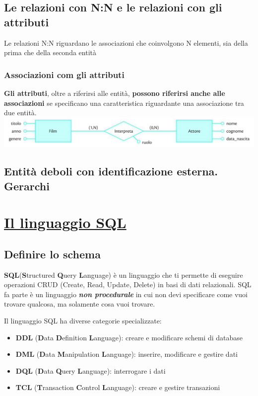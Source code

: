 \documentclass{article}
\begin{document}
\subsection{Le relazioni con N:N e le relazioni con gli attributi}
Le relazioni N:N riguardano le associazioni che coinvolgono N elementi, sia della prima che della seconda entità

\subsubsection{Associazioni com gli attributi}
\textbf{Gli attributi}, oltre a riferirsi alle entità, \textbf{possono riferirsi anche alle associazioni} se specificano una caratteristica riguardante una associazione tra due entità.\\
\includegraphics[scale=0.8]{as.PNG}\\
\subsection{Entità deboli con identificazione esterna. Gerarchi}

\section{\underline{Il linguaggio SQL}}
\subsection{Definire lo schema}
\textbf{SQL}(\textbf{S}tructured \textbf{Q}uery \textbf{L}anguage) è un linguaggio che ti permette di eseguire operazioni CRUD (Create, Read, Update, Delete) in basi di dati relazionali. SQL fa parte è un linguaggio \textit{\textbf{non procedurale}} in cui non devi specificare come vuoi trovare qualcosa, ma solamente cosa vuoi trovare. 

Il linguaggio SQL ha diverse categorie specializzate:
\begin{itemize}
    \item \textbf{DDL} (\textbf{D}ata \textbf{D}efinition \textbf{L}anguage): creare e modificare schemi di database 
    \item \textbf{DML} (\textbf{D}ata \textbf{M}anipulation \textbf{L}anguage): inserire, modificare e gestire dati 
    \item \textbf{DQL} (\textbf{D}ata \textbf{Q}uery \textbf{L}anguage): interrogare i dati
    \item \textbf{TCL} (\textbf{T}ransaction \textbf{C}ontrol \textbf{L}anguage): creare e gestire transazioni
    \end{itemize}
\end{document}
